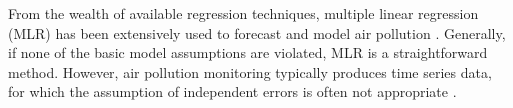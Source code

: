From the wealth of available regression techniques, multiple linear regression (MLR) has been extensively used to forecast and model air pollution \cite{atmos7020015}. Generally, if none of the basic model assumptions are violated, MLR is a straightforward method. 
However, air pollution monitoring typically produces time series data, for which the assumption of independent errors is often not appropriate \cite{Montgomery2012}.

